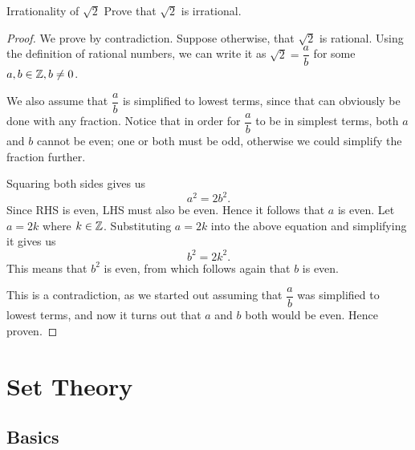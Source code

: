 \begin{exmp}{Irrationality of $\sqrt{2}$}{}
Prove that $\sqrt{2}$ is irrational.
\end{exmp}
\begin{proof}
We prove by contradiction. Suppose otherwise, that $\sqrt{2}$ is rational. Using the definition of rational numbers, we can write it as $\sqrt{2} = \dfrac{a}{b}$ for some $a,b\in\mathbb Z,b\neq 0$. 

We also assume that $\dfrac{a}{b}$ is simplified to lowest terms, since that can obviously be done with any fraction. Notice that in order for $\dfrac{a}{b}$ to be in simplest terms, both $a$ and $b$ cannot be even; one or both must be odd, otherwise we could simplify the fraction further.

Squaring both sides gives us
\[ a^2 = 2b^2. \]
Since RHS is even, LHS must also be even. Hence it follows that $a$ is even. Let $a=2k$ where $k\in\mathbb Z$. Substituting $a = 2k$ into the above equation and simplifying it gives us
\[ b^2=2k^2. \]
This means that $b^2$ is even, from which follows again that $b$ is even. 

This is a contradiction, as we started out assuming that $\dfrac{a}{b}$ was simplified to lowest terms, and now it turns out that $a$ and $b$ both would be even. Hence proven.
\end{proof}

\chapter{Set Theory}
\section{Basics}
